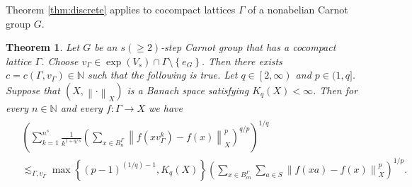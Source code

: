 \documentclass[11pt,reqno]{amsart}
\newtheorem{theorem}{Theorem}
\newcommand{\1}{\mathbf 1}
\begin{document}
Theorem \ref{thm:discrete} applies to cocompact lattices $\Gamma$ of a nonabelian Carnot group $G$.

\begin{theorem}\label{thm:discrete-Carnot}
Let $G$ be an $s\left(\ge 2\right)$-step Carnot group that has a cocompact lattice $\Gamma$. Choose $v_\Gamma\in \exp\left(V_s\right)\cap \Gamma\setminus\left\{e_G\right\}$. Then there exists $c=c\left(\Gamma,v_\Gamma\right)\in \mathbb{N}$ such that the following is true. Let $q\in \left[2,\infty\right)$ and $p\in (1,q]$. Suppose that $\left(X,\left\|\cdot\right\|_X\right)$ is a Banach space satisfying $K_q\left(X\right)<\infty$.  Then for every $n\in \mathbb{N}$ and every $f:\Gamma\to X$ we have
\begin{align*}
\begin{aligned}
&\left(\sum_{k=1}^{n^s}\frac{1}{k^{1+q/s}}\left(\sum_{x\in B^\Gamma_n} \left\|f\left(xv_\Gamma^k\right)-f\left(x\right)\right\|_X^p\right)^{q/p}\right)^{1/q}\\
&\lesssim_{\Gamma,v_\Gamma} \max\left\{\left(p-1\right)^{(1/q)-1},K_q\left(X\right)\right\} 
\left(\sum_{x\in B^\Gamma_{cn}} \sum_{a\in S}\left\|f\left(xa\right)-f\left(x\right)\right\|^p_X\right)^{1/p}.
\end{aligned}
\end{align*}
\end{theorem}
\end{document}

